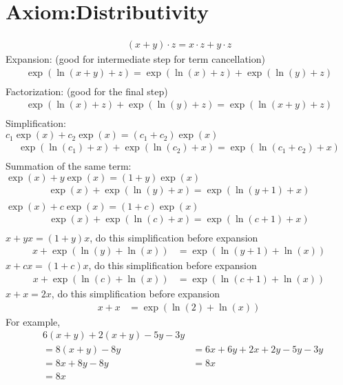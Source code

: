 \documentclass[12pt,a4paper]{report}
\begin{document}
\section{Axiom:Distributivity}
\label{Axiom:Distributivity}
\begin{align*}
(x+y) \cdot z = x \cdot z + y \cdot z
\end{align*}
Expansion: (good for intermediate step for term cancellation)
\begin{align*}
\exp(\ln(x+y) + z) = \exp(\ln(x) + z) + \exp(\ln(y) + z) \\
\end{align*}
Factorization: (good for the final step)
\begin{align*}
\exp(\ln(x) + z) + \exp(\ln(y) + z) = \exp(\ln(x+y) + z) \\
\end{align*}
Simplification: \\
$c_1 \exp(x) + c_2 \exp(x) = (c_1+c_2) \exp(x)$
\begin{align*}
\exp(\ln(c_1) + x) + \exp(\ln(c_2) + x) = \exp(\ln(c_1+c_2) + x) \\
\end{align*}
Summation of the same term: \\
$\exp(x) + y \exp(x) = (1+y) \exp(x)$
\begin{align*}
\exp(x) + \exp(\ln(y) + x) = \exp(\ln(y+1) + x) \\
\end{align*}
$\exp(x) + c \exp(x) = (1+c) \exp(x)$
\begin{align*}
\exp(x) + \exp(\ln(c) + x) = \exp(\ln(c+1) + x) \\
\end{align*}
$x + y x = (1+y) x$, do this simplification before expansion
\begin{align}
x + \exp(\ln(y) + \ln(x)) &= \exp(\ln(y+1) + \ln(x)) \label{Implementation:Summation_of_Term_1}
\end{align}
$x + c x = (1+c) x$, do this simplification before expansion
\begin{align}
x + \exp(\ln(c) + \ln(x)) &= \exp(\ln(c+1) + \ln(x)) \label{Implementation:Summation_of_Term_2}
\end{align}
$x + x = 2x$, do this simplification before expansion
\begin{align}
x + x &= \exp(\ln(2) + \ln(x)) \label{Implementation:Summation_of_Term_3}
\end{align}
For example,
\begin{align*}
& 6(x+y) + 2(x+y) - 5y - 3y \\
&= 8(x+y)- 8y &= 6x +6y + 2x +2y - 5y - 3y \\
&=8x+8y-8y &= 8x \\
&=8x
\end{align*}
\end{document}
